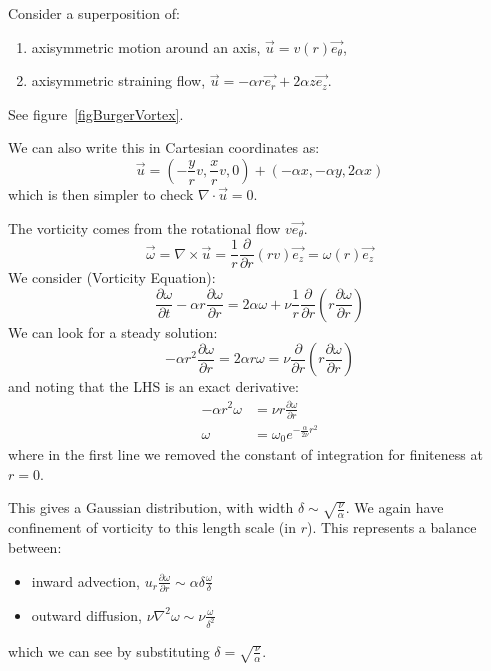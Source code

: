 \documentclass[../Main.tex]{subfiles}
\begin{document}
\begin{example}
    Consider a superposition of:
    \begin{enumerate}
        \item axisymmetric motion around an axis, $\vec u = v(r) \vec{e_\theta}$,
        \item axisymmetric straining flow, $\vec u = -\alpha r \vec{e_r} + 2\alpha z \vec{e_z}$.
    \end{enumerate}
    See figure~\ref{figBurgerVortex}.

    We can also write this in Cartesian coordinates as:
    \begin{equation*}
        \vec u = \left(-\frac y r v, \frac x r v, 0\right) + (-\alpha x, -\alpha y, 2\alpha x)
    \end{equation*}
    which is then simpler to check $\nabla \cdot \vec{u} = 0$.

    The vorticity comes from the rotational flow $v\vec{e_\theta}$.
    \begin{equation*}
        \vec\omega = \nabla \times \vec{u} = \frac1r \frac{\partial }{\partial r}\left(rv\right)\vec{e_z} = \omega(r) \vec{e_z}
    \end{equation*}
    We consider  (Vorticity Equation):
    \begin{equation*}
        \frac{\partial \omega}{\partial t} - \alpha r \frac{\partial \omega}{\partial r} = 2\alpha \omega + \nu \frac1r \frac{\partial}{\partial r} \left(r \frac{\partial \omega}{\partial r}\right)
    \end{equation*}
    We can look for a steady solution:
    \begin{equation*}
        -\alpha r^2 \frac{\partial \omega}{\partial r} = 2\alpha r \omega = \nu \frac{\partial }{\partial r} \left(r \frac{\partial \omega}{\partial r}\right)
    \end{equation*}
    and noting that the LHS is an exact derivative:
    \begin{align*}
        -\alpha r^2 \omega &= \nu r \frac{\partial \omega}{\partial r} \\
        \omega &= \omega_0 e^{-\frac{\alpha}{2\nu}r^2}    
    \end{align*}
    where in the first line we removed the constant of integration for finiteness at $r = 0$.

    This gives a Gaussian distribution, with width $\delta \sim \sqrt{\frac\nu\alpha}$. We again have confinement of vorticity to this length scale (in $r$). This represents a balance between:
    \begin{itemize}
        \item inward advection, $u_r \frac{\partial \omega}{\partial r} \sim \alpha\delta \frac{\omega}{\delta}$
        \item outward diffusion, $\nu \nabla^2 \omega \sim \nu \frac{\omega}{\delta^2}$
    \end{itemize}
    which we can see by substituting $\delta = \sqrt{\frac{\nu}{\alpha}}$.


\end{example}
\end{document}
